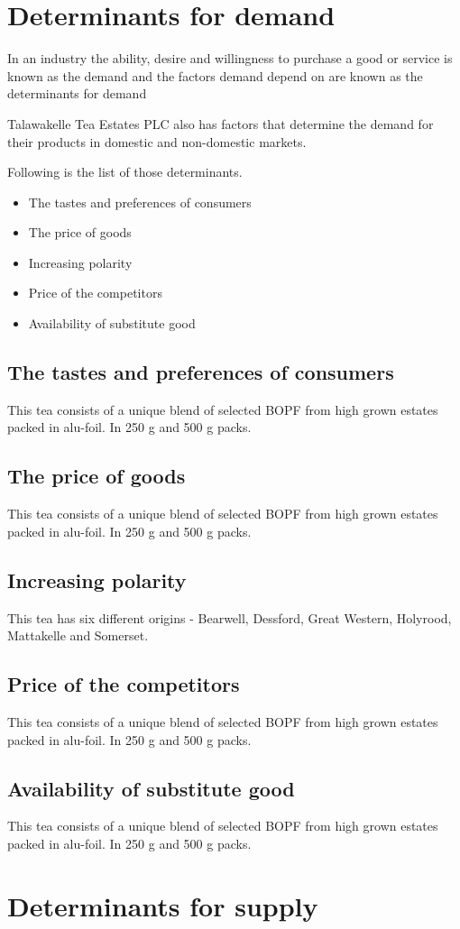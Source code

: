 \documentclass[12pt]{report}
\begin{document}
\section{Determinants for demand}
In an industry the ability, desire and willingness to purchase a good or service is known as the demand and the factors demand depend on are known as the determinants for demand

Talawakelle Tea Estates PLC also has factors that determine the demand for their products in domestic and non-domestic markets.

\noindent
Following is the list of those determinants.
\begin{itemize}
	\item {The tastes and preferences of consumers}
	\item {The price of goods}
	\item {Increasing polarity}
	\item {Price of the competitors}
	\item {Availability of substitute good}
\end{itemize}

\subsection{The tastes and preferences of consumers}
This tea consists of a unique blend of selected BOPF from high grown estates packed in alu-foil. In 250 g and 500 g packs.

\subsection{The price of goods}
This tea consists of a unique blend of selected BOPF from high grown estates packed in alu-foil. In 250 g and 500 g packs.

\subsection{Increasing polarity}
This tea has six different origins - Bearwell, Dessford, Great Western, Holyrood, Mattakelle and Somerset.

\subsection{Price of the competitors}
This tea consists of a unique blend of selected BOPF from high grown estates packed in alu-foil. In 250 g and 500 g packs.

\subsection{Availability of substitute good}
This tea consists of a unique blend of selected BOPF from high grown estates packed in alu-foil. In 250 g and 500 g packs.

\section{Determinants for supply}
\end{document}
